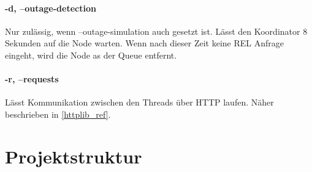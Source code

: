 \documentclass[12pt, letterpaper]{article}
\begin{document}
\paragraph{-d, --outage-detection}
Nur zulässig, wenn --outage-simulation auch gesetzt ist. Lässt den Koordinator 8 Sekunden auf die Node warten. Wenn nach dieser Zeit keine REL Anfrage eingeht, wird die Node as der Queue entfernt.

\paragraph{-r, --requests}
Lässt Kommunikation zwischen den Threads über HTTP laufen. Näher beschrieben in \ref{httplib_ref}.

\newpage

\section{Projektstruktur}
\hfill

\newpage


\end{document}
